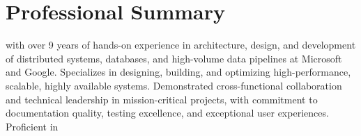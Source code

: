 
\section{Professional Summary}
\normalsize{\POSITION{} with over 9 years of hands-on experience in architecture, design, and development of distributed systems, databases, and high-volume data pipelines at Microsoft and Google. Specializes in designing, building, and optimizing high-performance, scalable, highly available systems. Demonstrated cross-functional collaboration and technical leadership in mission-critical projects, with commitment to documentation quality, testing excellence, and exceptional user experiences. Proficient in \LanguagesOrderSummary\MainTechnologies}